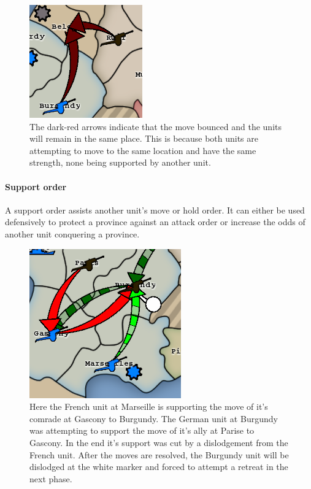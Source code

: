 \documentclass[pdftex,11pt,a4paper]{report}
\begin{document}
\begin{figure}
\includegraphics[scale=0.75]{./screenshots/BouncedMove.png} \\[1cm] 
The dark-red arrows indicate that the move bounced and the units will
remain in the same place. This is because both units are attempting 
to move to the same location and have the same strength, none being
supported by another unit.
\end{figure}

\paragraph{Support order}
A support order assists another unit's move or hold order. It can
either be used defensively to protect a province against an attack
order or increase the odds of another unit conquering a province.

\begin{figure}
\includegraphics[scale=0.75]{./screenshots/DefRetreat0.png} \\[1cm] 
Here the French unit at Marseille is supporting the move of it's
comrade at Gascony to Burgundy. The German unit at Burgundy was
attempting to support the move of it's ally at Parise to Gascony. In
the end it's support was cut by a dislodgement from the French
unit. After the moves are resolved, the Burgundy unit will be
dislodged at the white marker and forced to attempt a retreat in the
next phase.
\end{figure}
\end{document}

